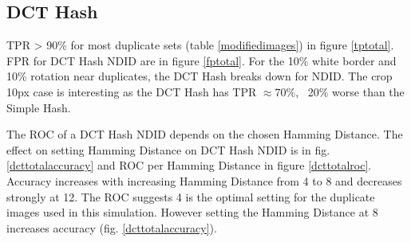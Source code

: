 \documentclass[english,12pt,a4paper,pdftex,elec,utf8]{aaltothesis}
\begin{document}
\subsection{DCT Hash}
TPR > 90\% for most duplicate sets (table \ref{modifiedimages}) in figure \ref{tptotal}. FPR for DCT Hash NDID are in figure \ref{fptotal}. For the 10\% white border and 10\% rotation near duplicates, the DCT Hash breaks down for NDID. The crop 10px case is interesting as the DCT Hash has TPR $\approx 70\%$, ~20\% worse than the Simple Hash.

The ROC of a DCT Hash NDID depends on the chosen Hamming Distance. The effect on setting Hamming Distance on DCT Hash NDID is in fig. \ref{dcttotalaccuracy} and ROC per Hamming Distance in figure \ref{dcttotalroc}. Accuracy increases with increasing Hamming Distance from 4 to 8 and decreases strongly at 12. The ROC suggests 4 is the optimal setting for the duplicate images used in this simulation. However setting the Hamming Distance at 8 increases accuracy (fig. \ref{dcttotalaccuracy}).
\end{document}
